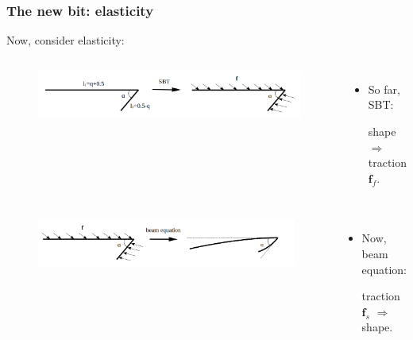 \documentclass{beamer}
\newcommand{\bi}{\begin{itemize}}
\newcommand{\ei}{\end{itemize}}
\begin{document}

\begin{frame}
	\frametitle{The new bit: elasticity}
	\begin{overlayarea}{\textwidth}{\textheight}
		\vspace{-0.5cm}\small	Now, consider elasticity:\vspace{-0.3cm}
		\begin{columns}
				\vspace{-0.5cm}
			\begin{figure}[htb]
				\begin{center}
					\includegraphics[width=1.05\textwidth]{plots/shape_to_traction.png}
				\end{center}
			\end{figure}
			\bi 
			\item \small So far, SBT:
			
			shape $\Longrightarrow$ traction $\mathbf{f}_f$.
			\ei
		\end{columns}
		\begin{columns}
				\vspace{-1cm}
			\begin{figure}[htb]
				\begin{center}
					\includegraphics[width=1.05\textwidth]{plots/traction_to_shape.png}
				\end{center}
			\end{figure}
			\vspace{-0.1cm}
			\bi 
			\item \small Now, beam equation:
			
			traction $\mathbf{f}_s$ $\Longrightarrow$ shape.
			\ei
		\end{columns}\vspace{0.2cm}
	\end{overlayarea}
\end{frame}
\end{document}
